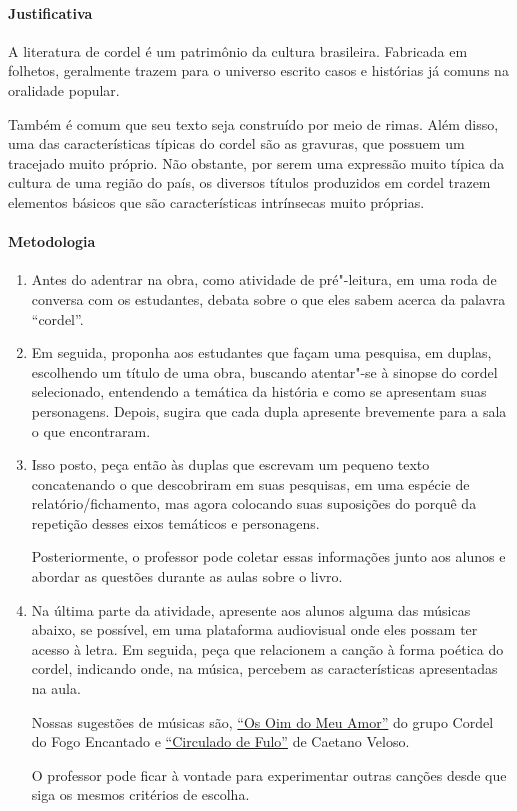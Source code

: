 \documentclass[12pt]{extarticle}
\begin{document}
\paragraph{Justificativa} A literatura de
cordel é um patrimônio da cultura brasileira. Fabricada em folhetos,
geralmente trazem para o universo escrito casos e histórias já comuns na
oralidade popular.

Também é comum que seu texto seja construído por meio
de rimas. Além disso, uma das características típicas do cordel são as
gravuras, que possuem um tracejado muito próprio. Não obstante, por
serem uma expressão muito típica da cultura de uma região do país, os
diversos títulos produzidos em cordel trazem elementos básicos que são
características intrínsecas muito próprias.

\paragraph{Metodologia}

\begin{enumerate}
\item
Antes do adentrar na obra, como atividade de pré"-leitura,
em uma roda de conversa com os estudantes, debata sobre o que eles 
sabem acerca da palavra ``cordel''.  

\item
Em seguida, proponha aos estudantes que façam uma pesquisa, em duplas, escolhendo 
um título de uma obra, buscando atentar"-se à sinopse do cordel selecionado, entendendo 
a temática da história e como se apresentam suas personagens. Depois, sugira que cada dupla
apresente brevemente para a sala o que encontraram. 

\item
Isso posto, peça então às duplas que escrevam um pequeno texto concatenando o que descobriram 
em suas pesquisas, em uma espécie de relatório/fichamento, mas agora colocando suas suposições do 
porquê da repetição desses eixos temáticos e personagens. 

Posteriormente, o professor pode coletar essas informações
junto aos alunos e abordar as questões durante as aulas sobre o livro.

\item
Na última parte da atividade, apresente aos alunos alguma das músicas abaixo, se possível, em uma 
plataforma audiovisual onde eles possam ter acesso à letra. 
Em seguida, peça que relacionem a canção à forma poética do cordel, indicando onde, na música, 
percebem as características apresentadas na aula. 

Nossas sugestões de músicas são, \href{https://www.youtube.com/watch?v=S1eE0lGpi-c&ab_channel=CordeldoFogoEncantado}{``Os Oim do Meu Amor''} 
do grupo Cordel do Fogo Encantado e \href{https://www.youtube.com/watch?v=pPmQYbTE21M&ab_channel=CaetanoVeloso-Topic}{``Circulado de Fulo''} de Caetano Veloso.

O professor pode ficar à vontade para experimentar outras canções desde que siga os
mesmos critérios de escolha. 


\end{enumerate}
\end{document}
